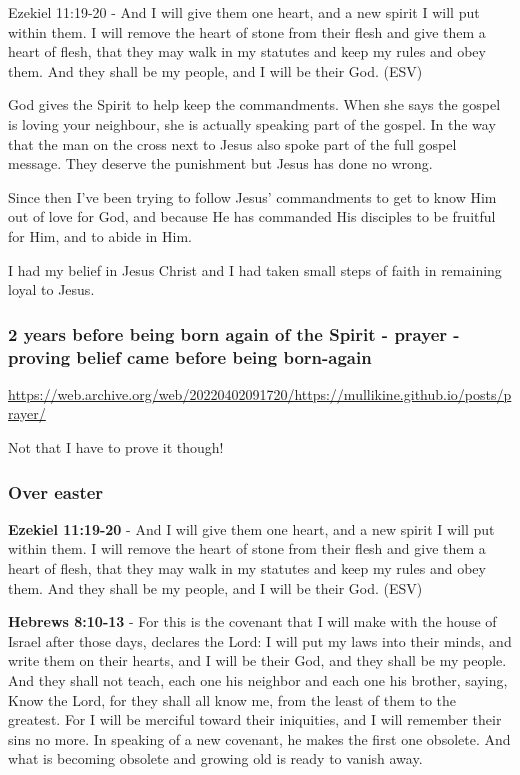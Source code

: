 \documentclass[11pt]{article}
\begin{document}
Ezekiel 11:19-20 - And I will give them one heart, and a new spirit I will put within them. I will remove the heart of stone from their flesh and give them a heart of flesh, that they may walk in my statutes and keep my rules and obey them. And they shall be my people, and I will be their God. (ESV)

God gives the Spirit to help keep the commandments. When she says the gospel is loving your neighbour, she is actually speaking part of the gospel. In the way that the man on the cross next to Jesus also spoke part of the full gospel message. They deserve the punishment but Jesus has done no wrong.

Since then I've been trying to follow Jesus' commandments to get to know Him out of love for God, and because He has commanded His disciples to be fruitful for Him, and to abide in Him.

I had my belief in Jesus Christ and I had taken small steps of faith in remaining loyal to Jesus.

\subsubsection{2 years before being born again of the Spirit - prayer - proving belief came before being born-again}
\label{sec:orgbfba6a1}
\url{https://web.archive.org/web/20220402091720/https://mullikine.github.io/posts/prayer/}

Not that I have to prove it though!

\subsubsection{Over easter}
\label{sec:org7a8234e}
\textbf{Ezekiel 11:19-20} - And I will give them one heart, and a new spirit I will put within them. I will remove the heart of stone from their flesh and give them a heart of flesh, that they may walk in my statutes and keep my rules and obey them. And they shall be my people, and I will be their God. (ESV)

\textbf{Hebrews 8:10-13} - For this is the covenant that I will make with the house of Israel after those days, declares the Lord: I will put my laws into their minds, and write them on their hearts, and I will be their God, and they shall be my people.  And they shall not teach, each one his neighbor and each one his brother, saying, Know the Lord, for they shall all know me, from the least of them to the greatest.  For I will be merciful toward their iniquities, and I will remember their sins no more.  In speaking of a new covenant, he makes the first one obsolete. And what is becoming obsolete and growing old is ready to vanish away.
\end{document}
